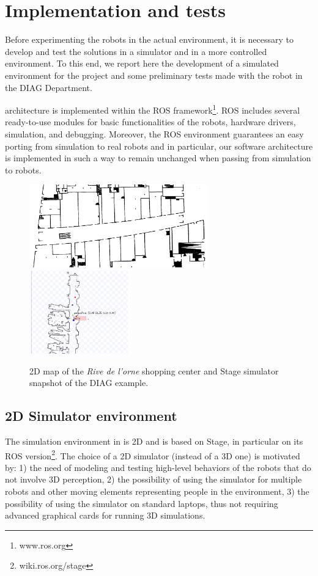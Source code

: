 \section{Implementation and tests}

Before experimenting the robots in the actual environment, it is necessary to develop and test the solutions in a simulator and in a more controlled environment. To this end, we report here the development of a simulated environment for the project and some preliminary tests made with the robot in the DIAG Department.

\coaches architecture is implemented within the ROS framework\footnote{www.ros.org}.
ROS includes several ready-to-use modules for basic functionalities of the robots, hardware drivers, simulation, and debugging.
Moreover, the ROS environment guarantees an easy porting from simulation to real robots and in particular, our software architecture is implemented in such a way to remain unchanged when passing from simulation to robots.

\begin{figure}[t!]
\centering
\includegraphics[height=3.6cm]{fig/Rive1.png}
\includegraphics[height=3.6cm]{fig/stage-demoDIAGPrinter2.png}
\caption{2D map of the \emph{Rive de l'orne} shopping center and Stage simulator snapshot of the DIAG example.}
\label{fig:stage}
\end{figure}

\subsection{2D Simulator environment}

The simulation environment in \coaches  is 2D and is based on Stage, in particular on its ROS version\footnote{wiki.ros.org/stage}.
The choice of a 2D simulator (instead of a 3D one) is motivated by: 1) the need of modeling and testing high-level behaviors of the robots that do not involve 3D perception, 2) the possibility of using the simulator for multiple robots and other moving elements representing people in the environment, 3) the possibility of using the simulator on standard laptops, thus not requiring advanced graphical cards for running 3D simulations.

